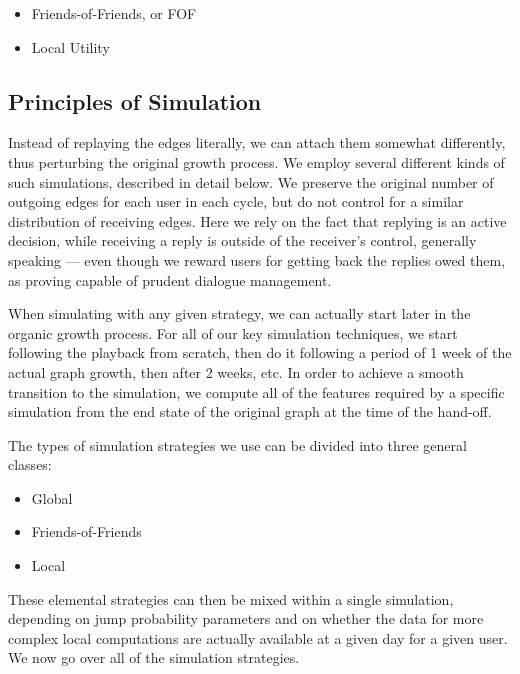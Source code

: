 \documentclass[10pt,oneside]{memoir}
\begin{document}
\begin{Spacing}{2}
\begin{itemize}
\item Friends-of-Friends, or FOF

\item Local Utility
\end{itemize}

\subsection{Principles of Simulation}
\label{principlesofsimulation}

Instead of replaying the edges literally, we can attach them somewhat differently, thus perturbing the original growth process.  We employ several different kinds of such simulations, described in detail below.  We preserve the original number of outgoing edges for each user in each cycle, but do not control for a similar distribution of receiving edges.  Here we rely on the fact that replying is an active decision, while receiving a reply is outside of the receiver's control, generally speaking --- even though we reward users for getting back the replies owed them, as proving capable of prudent dialogue management.


When simulating with any given strategy, we can actually start later in the organic growth process.  For all of our key simulation techniques, we start following the playback from scratch, then do it following a period of 1 week of the actual graph growth, then after 2 weeks, etc.  In order to achieve a smooth transition to the simulation, we compute all of the features required by a specific simulation from the end state of the original graph at the time of the hand-off.


The types of simulation strategies we use can be divided into three general classes:


\begin{itemize}


\item Global

\item Friends-of-Friends

\item Local
\end{itemize}

These elemental strategies can then be mixed within a single simulation, depending on jump probability parameters and on whether the data for more complex local computations are actually available at a given day for a given user.  We now go over all of the simulation strategies.



\end{Spacing}
\end{document}
